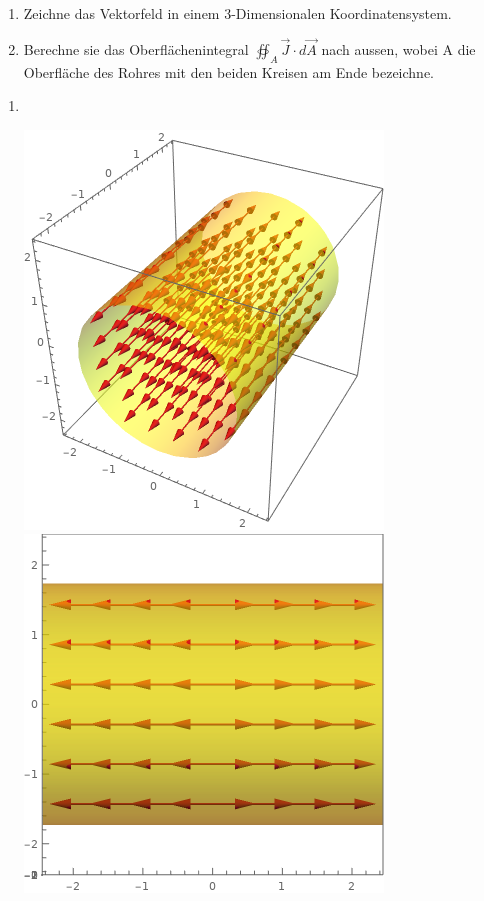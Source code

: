 \begin{enumerate}
	\item  Zeichne das Vektorfeld in einem 3-Dimensionalen Koordinatensystem. \\
	\item Berechne sie das Oberflächenintegral $ \oiint_A \vec{J} \cdot d\vec{A}$ nach aussen, wobei A die Oberfläche des Rohres mit den beiden Kreisen am Ende bezeichne.
\end{enumerate}
\iend

\newpage

\beginbsp
\begin{enumerate}
	\item  \
	\begin{center}

	      \includegraphics[scale=0.4]{plot.png}
	      \includegraphics[scale=0.3]{plot2.png}


\end{center}
\end{enumerate}
